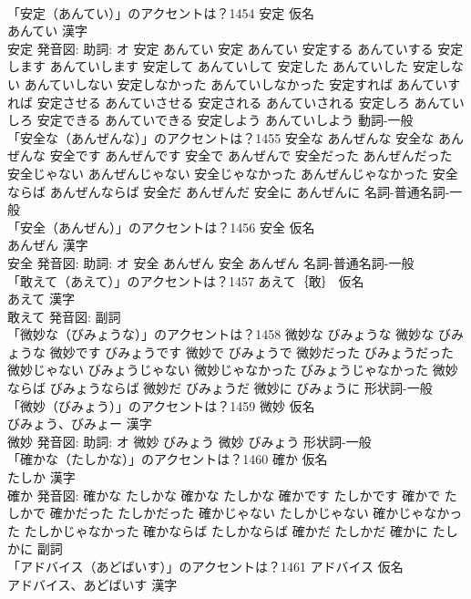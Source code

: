 \documentclass[8pt]{extreport}
\begin{document}
\begin{CJK}{UTF8}{min}
\\	「安定（あんてい）」のアクセントは？1454	安定 仮名　
\\	あんてい 漢字　
\\	安定 発音図: 助詞: オ	安定 あんてい		安定 あんてい 安定する あんていする 安定します あんていします 安定して あんていして 安定した あんていした 安定しない あんていしない 安定しなかった あんていしなかった 安定すれば あんていすれば 安定させる あんていさせる 安定される あんていされる 安定しろ あんていしろ 安定できる あんていできる 安定しよう あんていしよう				動詞-一般 
\\	「安全な（あんぜんな）」のアクセントは？1455		安全な あんぜんな		安全な あんぜんな 安全です あんぜんです 安全で あんぜんで 安全だった あんぜんだった 安全じゃない あんぜんじゃない 安全じゃなかった あんぜんじゃなかった 安全ならば あんぜんならば 安全だ あんぜんだ 安全に あんぜんに				名詞-普通名詞-一般 
\\	「安全（あんぜん）」のアクセントは？1456	安全 仮名　
\\	あんぜん 漢字　
\\	安全 発音図: 助詞: オ	安全 あんぜん		安全 あんぜん				名詞-普通名詞-一般 
\\	「敢えて（あえて）」のアクセントは？1457	あえて｛敢｝ 仮名　
\\	あえて 漢字　
\\	敢えて 発音図:							副詞 
\\	「微妙な（びみょうな）」のアクセントは？1458		微妙な びみょうな		微妙な びみょうな 微妙です びみょうです 微妙で びみょうで 微妙だった びみょうだった 微妙じゃない びみょうじゃない 微妙じゃなかった びみょうじゃなかった 微妙ならば びみょうならば 微妙だ びみょうだ 微妙に びみょうに				形状詞-一般 
\\	「微妙（びみょう）」のアクセントは？1459	微妙 仮名　
\\	びみょう、びみょー 漢字　
\\	微妙 発音図: 助詞: オ	微妙 びみょう		微妙 びみょう				形状詞-一般 
\\	「確かな（たしかな）」のアクセントは？1460	確か 仮名　
\\	たしか 漢字　
\\	確か 発音図:	確かな たしかな		確かな たしかな 確かです たしかです 確かで たしかで 確かだった たしかだった 確かじゃない たしかじゃない 確かじゃなかった たしかじゃなかった 確かならば たしかならば 確かだ たしかだ 確かに たしかに				副詞 
\\	「アドバイス（あどばいす）」のアクセントは？1461	アドバイス 仮名　
\\	アドバイス、あどばいす 漢字　

\end{CJK}
\end{document}
